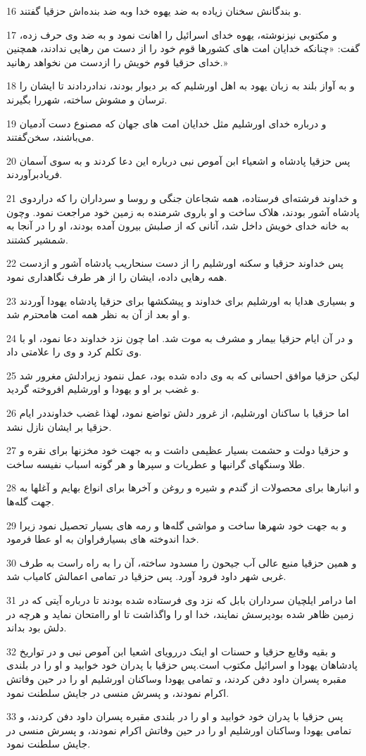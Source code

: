 \par 16 و بندگانش سخنان زیاده به ضد یهوه خدا وبه ضد بنده‌اش حزقیا گفتند.
\par 17 و مکتوبی نیزنوشته، یهوه خدای اسرائیل را اهانت نمود و به ضد وی حرف زده، گفت: «چنانکه خدایان امت های کشورها قوم خود را از دست من رهایی ندادند، همچنین خدای حزقیا قوم خویش را ازدست من نخواهد رهانید.»
\par 18 و به آواز بلند به زبان یهود به اهل اورشلیم که بر دیوار بودند، ندادر‌دادند تا ایشان را ترسان و مشوش ساخته، شهررا بگیرند.
\par 19 و درباره خدای اورشلیم مثل خدایان امت های جهان که مصنوع دست آدمیان می‌باشند، سخن‌گفتند.
\par 20 پس حزقیا پادشاه و اشعیاء ابن آموص نبی درباره این دعا کردند و به سوی آسمان فریادبرآوردند.
\par 21 و خداوند فرشته‌ای فرستاده، همه شجاعان جنگی و روسا و سرداران را که دراردوی پادشاه آشور بودند، هلاک ساخت و او باروی شرمنده به زمین خود مراجعت نمود. وچون به خانه خدای خویش داخل شد، آنانی که از صلبش بیرون آمده بودند، او را در آنجا به شمشیر کشتند.
\par 22 پس خداوند حزقیا و سکنه اورشلیم را از دست سنحاریب پادشاه آشور و ازدست همه رهایی داده، ایشان را از هر طرف نگاهداری نمود.
\par 23 و بسیاری هدایا به اورشلیم برای خداوند و پیشکشها برای حزقیا پادشاه یهودا آوردند و او بعد از آن به نظر همه امت هامحترم شد.
\par 24 و در آن ایام حزقیا بیمار و مشرف به موت شد. اما چون نزد خداوند دعا نمود، او با وی تکلم کرد و وی را علامتی داد.
\par 25 لیکن حزقیا موافق احسانی که به وی داده شده بود، عمل ننمود زیرادلش مغرور شد و غضب بر او و یهودا و اورشلیم افروخته گردید. 
\par 26 اما حزقیا با ساکنان اورشلیم، از غرور دلش تواضع نمود، لهذا غضب خداونددر ایام حزقیا بر ایشان نازل نشد.
\par 27 و حزقیا دولت و حشمت بسیار عظیمی داشت و به جهت خود مخزنها برای نقره و طلا وسنگهای گرانبها و عطریات و سپرها و هر گونه اسباب نفیسه ساخت.
\par 28 و انبارها برای محصولات از گندم و شیره و روغن و آخرها برای انواع بهایم و آغلها به جهت گله‌ها.
\par 29 و به جهت خود شهرها ساخت و مواشی گله‌ها و رمه های بسیار تحصیل نمود زیرا خدا اندوخته های بسیارفراوان به او عطا فرمود.
\par 30 و همین حزقیا منبع عالی آب جیحون را مسدود ساخته، آن را به راه راست به طرف غربی شهر داود فرود آورد. پس حزقیا در تمامی اعمالش کامیاب شد.
\par 31 اما درامر ایلچیان سرداران بابل که نزد وی فرستاده شده بودند تا درباره آیتی که در زمین ظاهر شده بودپرسش نمایند، خدا او را واگذاشت تا او راامتحان نماید و هر‌چه در دلش بود بداند.
\par 32 و بقیه وقایع حزقیا و حسنات او اینک دررویای اشعیا ابن آموص نبی و در تواریخ پادشاهان یهودا و اسرائیل مکتوب است.پس حزقیا با پدران خود خوابید و او را در بلندی مقبره پسران داود دفن کردند، و تمامی یهودا وساکنان اورشلیم او را در حین وفاتش اکرام نمودند، و پسرش منسی در جایش سلطنت نمود.
\par 33 پس حزقیا با پدران خود خوابید و او را در بلندی مقبره پسران داود دفن کردند، و تمامی یهودا وساکنان اورشلیم او را در حین وفاتش اکرام نمودند، و پسرش منسی در جایش سلطنت نمود.
 
